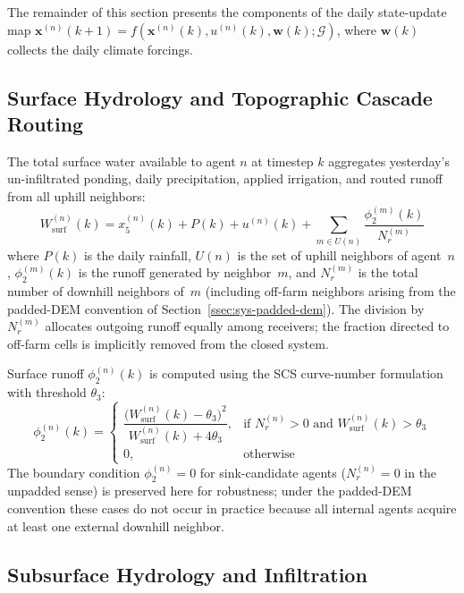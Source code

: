 The remainder of this section presents the components of the daily
state-update map
$\mathbf{x}^{(n)}(k+1) = f(\mathbf{x}^{(n)}(k), u^{(n)}(k), \mathbf{w}(k); \mathcal{G})$,
where $\mathbf{w}(k)$ collects the daily climate forcings.

\subsection{Surface Hydrology and Topographic Cascade Routing}
\label{ssec:sys-surface}

The total surface water available to agent $n$ at timestep $k$
aggregates yesterday's un-infiltrated ponding, daily precipitation,
applied irrigation, and routed runoff from all uphill neighbors:
\begin{equation}
W_{\mathrm{surf}}^{(n)}(k) = x_5^{(n)}(k) + P(k) + u^{(n)}(k)
+ \sum_{m \in U(n)} \frac{\phi_2^{(m)}(k)}{N_r^{(m)}}
\label{eq:wsurf}
\end{equation}
where $P(k)$ is the daily rainfall, $U(n)$ is the set of uphill
neighbors of agent~$n$, $\phi_2^{(m)}(k)$ is the runoff generated by
neighbor~$m$, and $N_r^{(m)}$ is the total number of downhill
neighbors of~$m$ (including off-farm neighbors arising from the
padded-DEM convention of Section~\ref{ssec:sys-padded-dem}). The
division by $N_r^{(m)}$ allocates outgoing runoff equally among
receivers; the fraction directed to off-farm cells is implicitly
removed from the closed system.

Surface runoff $\phi_2^{(n)}(k)$ is computed using the SCS curve-number
formulation with threshold $\theta_3$:
\begin{equation}
\phi_2^{(n)}(k) =
\begin{cases}
\dfrac{\bigl(W_{\mathrm{surf}}^{(n)}(k) - \theta_3\bigr)^2}
      {W_{\mathrm{surf}}^{(n)}(k) + 4\theta_3},
& \text{if } N_r^{(n)} > 0 \text{ and } W_{\mathrm{surf}}^{(n)}(k) > \theta_3 \\
0, & \text{otherwise}
\end{cases}
\label{eq:phi2}
\end{equation}
The boundary condition $\phi_2^{(n)} = 0$ for sink-candidate agents
($N_r^{(n)} = 0$ in the unpadded sense) is preserved here for
robustness; under the padded-DEM convention these cases do not occur
in practice because all internal agents acquire at least one external
downhill neighbor.

\subsection{Subsurface Hydrology and Infiltration}
\label{ssec:sys-subsurface}

